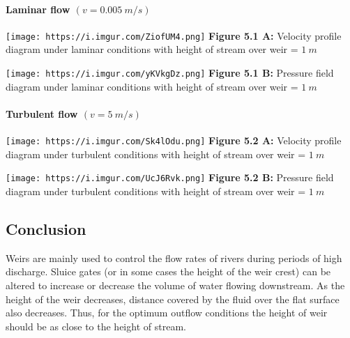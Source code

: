 \documentclass[11pt]{article}
\makeatletter
\newcommand{\boxspacing}{\kern\kvtcb@left@rule\kern\kvtcb@boxsep}
\newcommand{\prompt}[4]{
        {\ttfamily\llap{{\color{#2}[#3]:\hspace{3pt}#4}}\vspace{-\baselineskip}}
    }
\makeatother
\begin{document}
\hypertarget{laminar-flow-v-0.005-ms-2}{%
\paragraph{\texorpdfstring{Laminar flow
\((v = 0.005\ m/s)\)}{Laminar flow (v = 0.005\textbackslash{} m/s)}}\label{laminar-flow-v-0.005-ms-2}}

\texttt{[image: https://i.imgur.com/ZiofUM4.png]} \textbf{Figure 5.1 A:}
Velocity profile diagram under laminar conditions with height of stream
over weir = \(1\ m\)

\texttt{[image: https://i.imgur.com/yKVkgDz.png]} \textbf{Figure 5.1 B:}
Pressure field diagram under laminar conditions with height of stream
over weir = \(1\ m\)

\hypertarget{turbulent-flow-v-5-ms-2}{%
\paragraph{\texorpdfstring{Turbulent flow
\((v = 5\ m/s)\)}{Turbulent flow (v = 5\textbackslash{} m/s)}}\label{turbulent-flow-v-5-ms-2}}

\texttt{[image: https://i.imgur.com/Sk4lOdu.png]} \textbf{Figure 5.2 A:}
Velocity profile diagram under turbulent conditions with height of
stream over weir = \(1\ m\)

\texttt{[image: https://i.imgur.com/UcJ6Rvk.png]} \textbf{Figure 5.2 B:}
Pressure field diagram under turbulent conditions with height of stream
over weir = \(1\ m\)

\hypertarget{conclusion}{%
\subsection{Conclusion}\label{conclusion}}

Weirs are mainly used to control the flow rates of rivers during periods
of high discharge. Sluice gates (or in some cases the height of the weir
crest) can be altered to increase or decrease the volume of water
flowing downstream. As the height of the weir decreases, distance
covered by the fluid over the flat surface also decreases. Thus, for the
optimum outflow conditions the height of weir should be as close to the
height of stream.

    \begin{tcolorbox}[breakable, size=fbox, boxrule=1pt, pad at break*=1mm,colback=cellbackground, colframe=cellborder]
\prompt{In}{incolor}{ }{\boxspacing}
\begin{Verbatim}[commandchars=\\\{\}]

\end{Verbatim}
\end{tcolorbox}


    
    
    
\end{document}
